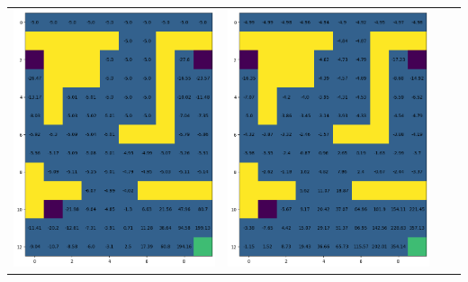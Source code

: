\begin{landscape}
\begin{center}
\begin{tabular}{c || c  c  c}
            \includegraphics[width=0.35\textheight]{assets/dp/analysis/prob_0.25_gamma_0.8_value.png}
        &
            \includegraphics[width=0.35\textheight]{assets/dp/analysis/prob_0.5_gamma_0.8_value.png}

\end{tabular}
\end{center}
\end{landscape}
